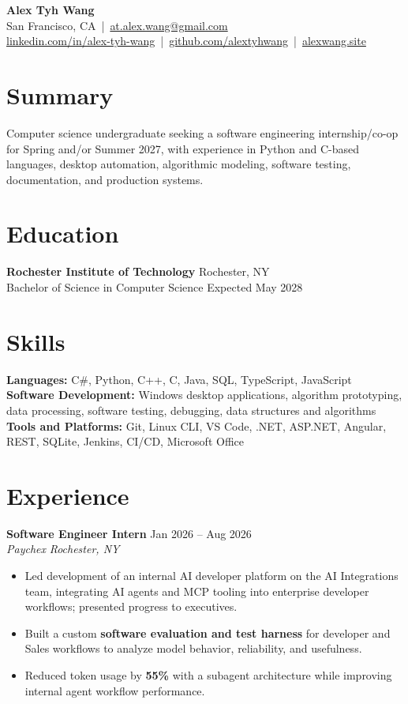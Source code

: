 \documentclass[10pt,letterpaper]{article}
\newif\ifresumeFirstRole
\newcommand{\resumeRole}[4]{%
  \ifresumeFirstRole
    \global\resumeFirstRolefalse
  \else
    \vspace{0pt plus 1fill}%
  \fi
  \textbf{#1} \hfill #2\\
  \textit{#3} \hfill \textit{#4}
}
\begin{document}
\begin{center}
{\Large \textbf{Alex Tyh Wang}}\\
San Francisco, CA \,|\, \href{mailto:at.alex.wang@gmail.com}{at.alex.wang@gmail.com}\\
\small \href{https://www.linkedin.com/in/alex-tyh-wang/}{linkedin.com/in/alex-tyh-wang} \,|\, \href{https://github.com/alextyhwang}{github.com/alextyhwang} \,|\, \href{https://alexwang.site}{alexwang.site}
\end{center}

\section*{Summary}
Computer science undergraduate seeking a software engineering internship/co-op for Spring and/or Summer 2027, with experience in Python and C-based languages, desktop automation, algorithmic modeling, software testing, documentation, and production systems.

\section*{Education}
\textbf{Rochester Institute of Technology} \hfill Rochester, NY\\
Bachelor of Science in Computer Science \hfill Expected May 2028

\section*{Skills}
\textbf{Languages:} C\#, Python, C++, C, Java, SQL, TypeScript, JavaScript\\
\textbf{Software Development:} Windows desktop applications, algorithm prototyping, data processing, software testing, debugging, data structures and algorithms\\
\textbf{Tools and Platforms:} Git, Linux CLI, VS Code, .NET, ASP.NET, Angular, REST, SQLite, Jenkins, CI/CD, Microsoft Office

\section*{Experience}
\resumeRole{Software Engineer Intern}{Jan 2026 -- Aug 2026}{Paychex}{Rochester, NY}
\begin{itemize}
  \item Led development of an internal AI developer platform on the AI Integrations team, integrating AI agents and MCP tooling into enterprise developer workflows; presented progress to executives.
  \item Built a custom \textbf{software evaluation and test harness} for developer and Sales workflows to analyze model behavior, reliability, and usefulness.
  \item Reduced token usage by \textbf{55\%} with a subagent architecture while improving internal agent workflow performance.
\end{itemize}
\end{document}
